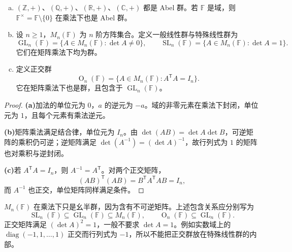 \documentclass[lang=cn,a4paper,fontset=none,zihao=false,10pt,openany,twoside]{beautybook}
\numberwithin{algorithm}{chapter}
\begin{document}
\begin{example}[加法群与矩阵群]
\begin{enumerate}[(a)]
\item $(\mathbb Z,+)$、$(\mathbb Q,+)$、$(\mathbb R,+)$、$(\mathbb C,+)$ 都是 Abel 群。若 $\mathbb F$ 是域，则 $\mathbb F^\times=\mathbb F\setminus\{0\}$ 在乘法下也是 Abel 群。
\item 设 $n\ge1$，$M_n(\mathbb F)$ 为 $n$ 阶方阵集合。定义一般线性群与特殊线性群为
\[
 \operatorname{GL}_n(\mathbb F)=\{A\in M_n(\mathbb F):\det A\ne0\},
 \qquad
 \operatorname{SL}_n(\mathbb F)=\{A\in M_n(\mathbb F):\det A=1\}.
\]
它们在矩阵乘法下均为群。
\item 定义正交群
\[
 \operatorname O_n(\mathbb F)=\{A\in M_n(\mathbb F):A^{\mathsf T}A=I_n\}.
\]
它在矩阵乘法下也是群，且包含于 $\operatorname{GL}_n(\mathbb F)$。
\end{enumerate}
\end{example}
\begin{proof}
\par\smallskip\noindent\textbf{(a)}\quad 加法的单位元为 $0$，$a$ 的逆元为 $-a$。域的非零元素在乘法下封闭，单位元为 $1$，且每个元素有乘法逆元。
\par\smallskip\noindent\textbf{(b)}\quad 矩阵乘法满足结合律，单位元为 $I_n$。由 $\det(AB)=\det A\det B$，可逆矩阵的乘积仍可逆；逆矩阵满足 $\det(A^{-1})=(\det A)^{-1}$，故行列式为 $1$ 的矩阵也对乘积与逆封闭。
\par\smallskip\noindent\textbf{(c)}\quad 若 $A^{\mathsf T}A=I_n$，则 $A^{-1}=A^{\mathsf T}$。对两个正交矩阵，
\[
 (AB)^{\mathsf T}(AB)=B^{\mathsf T}A^{\mathsf T}AB=I_n,
\]
而 $A^{-1}$ 也正交，单位矩阵同样满足条件。
\end{proof}
\begin{remark}
$M_n(\mathbb F)$ 在乘法下只是幺半群，因为含有不可逆矩阵。上述包含关系应分别写为
\[
 \operatorname{SL}_n(\mathbb F)\subseteq\operatorname{GL}_n(\mathbb F)\subseteq M_n(\mathbb F),
 \qquad
 \operatorname O_n(\mathbb F)\subseteq\operatorname{GL}_n(\mathbb F).
\]
正交矩阵满足 $(\det A)^2=1$，一般不要求 $\det A=1$。例如实数域上的 $\operatorname{diag}(-1,1,\ldots,1)$ 正交而行列式为 $-1$，所以不能把正交群放在特殊线性群的内部。
\end{remark}
\end{document}
